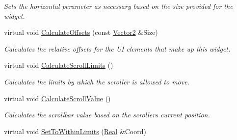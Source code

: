 \begin{DoxyCompactItemize}
\begin{DoxyCompactList}\small\item\em Sets the horizontal perameter as necessary based on the size provided for the widget. \item\end{DoxyCompactList}\item 
\hypertarget{classphys_1_1UI_1_1Scrollbar_a4621d6713a059196f1a358a23b9ad5ae}{
virtual void \hyperlink{classphys_1_1UI_1_1Scrollbar_a4621d6713a059196f1a358a23b9ad5ae}{CalculateOffsets} (const \hyperlink{classphys_1_1Vector2}{Vector2} \&Size)}
\label{d0/d3e/classphys_1_1UI_1_1Scrollbar_a4621d6713a059196f1a358a23b9ad5ae}

\begin{DoxyCompactList}\small\item\em Calculates the relative offsets for the UI elements that make up this widget. \item\end{DoxyCompactList}\item 
\hypertarget{classphys_1_1UI_1_1Scrollbar_aa59e2c0662ac13fac037164c86f829f5}{
virtual void \hyperlink{classphys_1_1UI_1_1Scrollbar_aa59e2c0662ac13fac037164c86f829f5}{CalculateScrollLimits} ()}
\label{d0/d3e/classphys_1_1UI_1_1Scrollbar_aa59e2c0662ac13fac037164c86f829f5}

\begin{DoxyCompactList}\small\item\em Calculates the limits by which the scroller is allowed to move. \item\end{DoxyCompactList}\item 
\hypertarget{classphys_1_1UI_1_1Scrollbar_afc9eb290c8dcf3935e2b3046063989e9}{
virtual void \hyperlink{classphys_1_1UI_1_1Scrollbar_afc9eb290c8dcf3935e2b3046063989e9}{CalculateScrollValue} ()}
\label{d0/d3e/classphys_1_1UI_1_1Scrollbar_afc9eb290c8dcf3935e2b3046063989e9}

\begin{DoxyCompactList}\small\item\em Calculates the scrollbar value based on the scrollers current position. \item\end{DoxyCompactList}\item 
\hypertarget{classphys_1_1UI_1_1Scrollbar_a2048345c29ba15b8820971492f2bdea1}{
virtual void \hyperlink{classphys_1_1UI_1_1Scrollbar_a2048345c29ba15b8820971492f2bdea1}{SetToWithinLimits} (\hyperlink{namespacephys_af7eb897198d265b8e868f45240230d5f}{Real} \&Coord)}
\label{d0/d3e/classphys_1_1UI_1_1Scrollbar_a2048345c29ba15b8820971492f2bdea1}


\end{DoxyCompactItemize}
